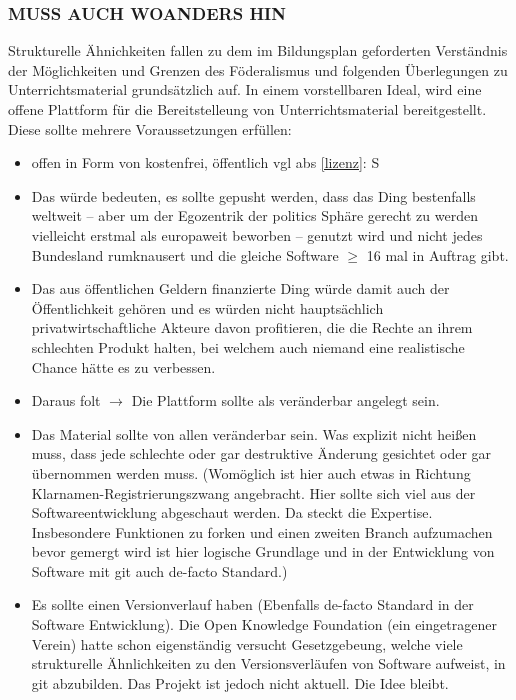 \subsubsection{MUSS AUCH WOANDERS HIN}
Strukturelle Ähnichkeiten fallen zu dem im Bildungsplan geforderten Verständnis der Möglichkeiten und Grenzen des Föderalismus und folgenden Überlegungen zu Unterrichtsmaterial grundsätzlich auf.
In einem vorstellbaren Ideal, wird eine offene Plattform für die Bereitstelleung von Unterrichtsmaterial bereitgestellt.
Diese sollte mehrere Voraussetzungen erfüllen:
\begin{itemize}
    \item offen in Form von kostenfrei, öffentlich \gls{vgl} \gls{abs} \ref{lizenz}: \gls{S} \pageref{lizenz}
    \item Das würde bedeuten, es sollte gepusht werden, dass das Ding bestenfalls weltweit -- aber um der Egozentrik der politics Sphäre gerecht zu werden vielleicht erstmal als europaweit beworben -- genutzt wird und nicht jedes Bundesland rumknausert und die gleiche Software $\geq$ 16 mal in Auftrag gibt.
    \item Das aus öffentlichen Geldern finanzierte Ding würde damit auch der Öffentlichkeit gehören und es würden nicht hauptsächlich privatwirtschaftliche Akteure davon profitieren, die die Rechte an ihrem schlechten Produkt halten, bei welchem auch niemand eine realistische Chance hätte es zu verbessen.
    \item Daraus folt $\rightarrow$ Die Plattform sollte als veränderbar angelegt sein.
    \item Das Material sollte von allen veränderbar sein. Was explizit nicht heißen muss, dass jede schlechte oder gar destruktive Änderung gesichtet oder gar übernommen werden muss.
    (Womöglich ist hier auch etwas in Richtung Klarnamen-Registrierungszwang angebracht. Hier sollte sich viel aus der Softwareentwicklung abgeschaut werden. Da steckt die Expertise. Insbesondere Funktionen zu forken und einen zweiten Branch aufzumachen bevor gemergt wird ist hier logische Grundlage und in der Entwicklung von Software mit git auch de-facto Standard.)
    \item Es sollte einen Versionverlauf haben (Ebenfalls de-facto Standard in der Software Entwicklung). Die Open Knowledge Foundation (ein eingetragener Verein) hatte schon eigenständig versucht Gesetzgebeung, welche viele strukturelle Ähnlichkeiten zu den Versionsverläufen von Software aufweist, in git abzubilden. Das Projekt ist jedoch nicht aktuell. Die Idee bleibt.

\end{itemize}
